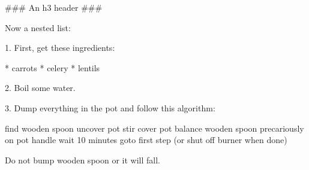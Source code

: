 
\usepackage[hashEnumerators]{markdown}


\begin{markdown}
### An h3 header ###

Now a nested list:

 1. First, get these ingredients:

      * carrots
      * celery
      * lentils

 2. Boil some water.

 3. Dump everything in the pot and follow
    this algorithm:

        find wooden spoon
        uncover pot
        stir
        cover pot
        balance wooden spoon precariously on pot handle
        wait 10 minutes
        goto first step (or shut off burner when done)

    Do not bump wooden spoon or it will fall.
\end{markdown}

